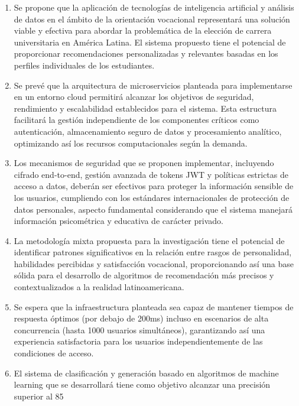 \begin{enumerate}
  \item Se propone que la aplicación de tecnologías de inteligencia artificial y análisis de datos en el ámbito de la orientación vocacional representará una solución viable y efectiva para abordar la problemática de la elección de carrera universitaria en América Latina. El sistema propuesto tiene el potencial de proporcionar recomendaciones personalizadas y relevantes basadas en los perfiles individuales de los estudiantes.
  
  \item Se prevé que la arquitectura de microservicios planteada para implementarse en un entorno cloud permitirá alcanzar los objetivos de seguridad, rendimiento y escalabilidad establecidos para el sistema. Esta estructura facilitará la gestión independiente de los componentes críticos como autenticación, almacenamiento seguro de datos y procesamiento analítico, optimizando así los recursos computacionales según la demanda.
  
  \item Los mecanismos de seguridad que se proponen implementar, incluyendo cifrado end-to-end, gestión avanzada de tokens JWT y políticas estrictas de acceso a datos, deberán ser efectivos para proteger la información sensible de los usuarios, cumpliendo con los estándares internacionales de protección de datos personales, aspecto fundamental considerando que el sistema manejará información psicométrica y educativa de carácter privado.
  
  \item La metodología mixta propuesta para la investigación tiene el potencial de identificar patrones significativos en la relación entre rasgos de personalidad, habilidades percibidas y satisfacción vocacional, proporcionando así una base sólida para el desarrollo de algoritmos de recomendación más precisos y contextualizados a la realidad latinoamericana.
  
  \item Se espera que la infraestructura planteada sea capaz de mantener tiempos de respuesta óptimos (por debajo de 200ms) incluso en escenarios de alta concurrencia (hasta 1000 usuarios simultáneos), garantizando así una experiencia satisfactoria para los usuarios independientemente de las condiciones de acceso.
  
  \item El sistema de clasificación y generación basado en algoritmos de machine learning que se desarrollará tiene como objetivo alcanzar una precisión superior al 85%
  

\end{enumerate}
